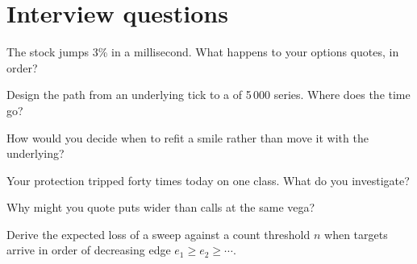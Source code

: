 \section{Interview questions}

\begin{interviewq}\label{iq:hf:automated-options-market-making:1}
The stock jumps 3\% in a millisecond. What happens to your options quotes, in order?
\end{interviewq}

\begin{interviewq}\label{iq:hf:automated-options-market-making:2}
Design the path from an underlying tick to a  of 5\,000 series. Where does the time go?
\end{interviewq}

\begin{interviewq}\label{iq:hf:automated-options-market-making:3}
How would you decide when to refit a smile rather than move it with the underlying?
\end{interviewq}

\begin{interviewq}\label{iq:hf:automated-options-market-making:4}
Your protection tripped forty times today on one class. What do you investigate?
\end{interviewq}

\begin{interviewq}\label{iq:hf:automated-options-market-making:5}
Why might you quote puts wider than calls at the same vega?
\end{interviewq}

\begin{interviewq}\label{iq:hf:automated-options-market-making:6}
Derive the expected loss of a sweep against a count threshold $n$ when targets arrive in order of decreasing edge $e_1\ge e_2\ge\cdots$.
\end{interviewq}
